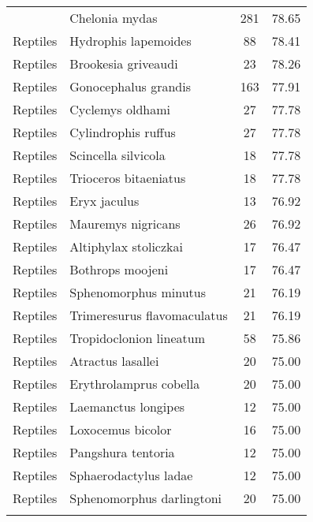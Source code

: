 \begin{longtable}{llcc}
{  Reptiles & Chelonia mydas & 281 & 78.65 \\ 
  Reptiles & Hydrophis lapemoides &  88 & 78.41 \\ 
  Reptiles & Brookesia griveaudi &  23 & 78.26 \\ 
  Reptiles & Gonocephalus grandis & 163 & 77.91 \\ 
  Reptiles & Cyclemys oldhami &  27 & 77.78 \\ 
  Reptiles & Cylindrophis ruffus &  27 & 77.78 \\ 
  Reptiles & Scincella silvicola &  18 & 77.78 \\ 
  Reptiles & Trioceros bitaeniatus &  18 & 77.78 \\ 
  Reptiles & Eryx jaculus &  13 & 76.92 \\ 
  Reptiles & Mauremys nigricans &  26 & 76.92 \\ 
  Reptiles & Altiphylax stoliczkai &  17 & 76.47 \\ 
  Reptiles & Bothrops moojeni &  17 & 76.47 \\ 
  Reptiles & Sphenomorphus minutus &  21 & 76.19 \\ 
  Reptiles & Trimeresurus flavomaculatus &  21 & 76.19 \\ 
  Reptiles & Tropidoclonion lineatum &  58 & 75.86 \\ 
  Reptiles & Atractus lasallei &  20 & 75.00 \\ 
  Reptiles & Erythrolamprus cobella &  20 & 75.00 \\ 
  Reptiles & Laemanctus longipes &  12 & 75.00 \\ 
  Reptiles & Loxocemus bicolor &  16 & 75.00 \\ 
  Reptiles & Pangshura tentoria &  12 & 75.00 \\ 
  Reptiles & Sphaerodactylus ladae &  12 & 75.00 \\ 
  Reptiles & Sphenomorphus darlingtoni &  20 & 75.00 \\ 
   \hline
\hline
\label{table-best}
\end{longtable}
